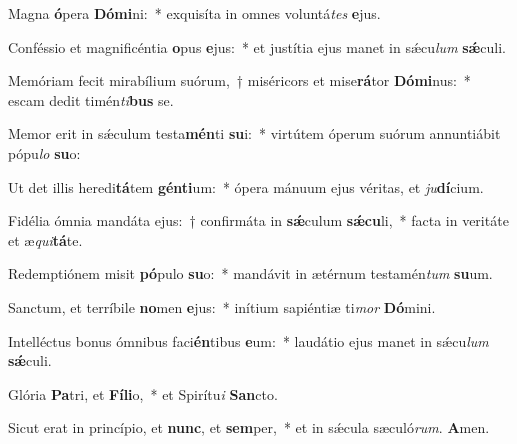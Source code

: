 ﻿\item Magna \textbf{ó}pera \textbf{Dó}\textbf{mi}ni:~* exquisíta in omnes voluntá\textit{tes} \textbf{e}jus.

\item Conféssio et magnificéntia \textbf{o}pus \textbf{e}jus:~* et justítia ejus manet in sǽcu\textit{lum} \textbf{sǽ}culi.

\item Memóriam fecit mirabílium suórum,~† miséricors et mise\textbf{rá}tor \textbf{Dó}\textbf{mi}nus:~* escam dedit timén\textit{ti}\textbf{bus} se.

\item Memor erit in sǽculum testa\textbf{mén}ti \textbf{su}i:~* virtútem óperum suórum annuntiábit pópu\textit{lo} \textbf{su}o:

\item Ut det illis heredi\textbf{tá}tem \textbf{gén}\textbf{ti}um:~* ópera mánuum ejus véritas, et \textit{ju}\textbf{dí}cium.

\item Fidélia ómnia mandáta ejus:~† confirmáta in \textbf{sǽ}culum \textbf{sǽ}\textbf{cu}li,~* facta in veritáte et æ\textit{qui}\textbf{tá}te.

\item Redemptiónem misit \textbf{pó}pulo \textbf{su}o:~* mandávit in ætérnum testamén\textit{tum} \textbf{su}um.

\item Sanctum, et terríbile \textbf{no}men \textbf{e}jus:~* inítium sapiéntiæ ti\textit{mor} \textbf{Dó}mini.

\item Intelléctus bonus ómnibus faci\textbf{én}tibus \textbf{e}um:~* laudátio ejus manet in sǽcu\textit{lum} \textbf{sǽ}culi.

\item Glória \textbf{Pa}tri, et \textbf{Fí}\textbf{li}o,~* et Spirítu\textit{i} \textbf{San}cto.

\item Sicut erat in princípio, et \textbf{nunc}, et \textbf{sem}per,~* et in sǽcula sæculó\textit{rum}. \textbf{A}men.